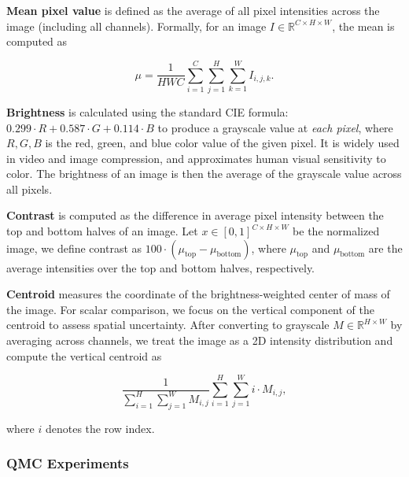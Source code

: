 \documentclass[12pt]{article}
\newcommand{\0}{\mathbf{0}}
\begin{document}
\textbf{Mean pixel value} is defined as the average of all pixel intensities across the image (including all channels). Formally, for an image $I \in \mathbb{R}^{C\times H \times W}$, the mean is computed as 

\[\mu = \frac{1}{HWC} \sum_{i=1}^C \sum_{j=1}^H \sum_{k=1}^W I_{i,j,k}.\]

\textbf{Brightness} is calculated using the standard CIE formula: $0.299 \cdot R + 0.587 \cdot G + 0.114 \cdot B$ to produce a grayscale value at \textit{each pixel}, where $R,G,B$ is the red, green, and blue color value of the given pixel. It is widely used in video and image compression, and approximates human visual sensitivity to color. The brightness of an image is then the average of the grayscale value across all pixels. 

\textbf{Contrast} is computed as the difference in average pixel intensity between the top and bottom halves of an image. Let $x \in [0,1]^{C \times H \times W}$ be the normalized image, we define contrast as $100 \cdot (\mu_\text{top} - \mu_\text{bottom})$, where $\mu_\text{top}$ and $\mu_\text{bottom}$ are the average intensities over the top and bottom halves, respectively.

\textbf{Centroid} measures the coordinate of the brightness-weighted center of mass of the image. For scalar comparison, we focus on the vertical component of the centroid to assess spatial uncertainty. After converting to grayscale $M \in \mathbb{R}^{H \times W}$ by averaging across channels, we treat the image as a 2D intensity distribution and compute the vertical centroid as 

\[\frac{1}{\sum_{i=1}^{H}\sum_{j=1}^W M_{i,j}} \sum_{i=1}^{H}\sum_{j=1}^Wi \cdot M_{i,j},\]

where $i$ denotes the row index. 

\subsubsection{QMC Experiments}
\end{document}
